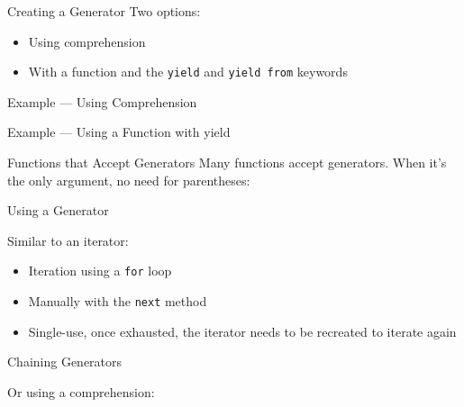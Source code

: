   \begin{frame}{Creating a Generator}
  Two options:
  
  \begin{itemize}[<+->]
  \item Using comprehension
  \item With a function and the \texttt{yield} and \texttt{yield from} keywords
  \end{itemize}
  \end{frame}
  
  \begin{frame}{Example --- Using Comprehension}
  \end{frame}
  
  \begin{frame}{Example --- Using a Function with yield}
  \end{frame}
  
  \begin{frame}{Functions that Accept Generators}
  Many functions accept generators. When it's the only argument, no need for parentheses:
  
  \end{frame}
  
  \begin{frame}{Using a Generator}
  
  Similar to an iterator:
  
  \begin{itemize}[<+->]
  \item Iteration using a \texttt{for} loop 
  \item Manually with the \texttt{next} method 
  \item \alert{Single-use}, once exhausted, the iterator needs to be recreated to iterate again
  \end{itemize}
  \end{frame}
  
  \begin{frame}{Chaining Generators}
  
  Or using a comprehension:
  
  \end{frame}
  

